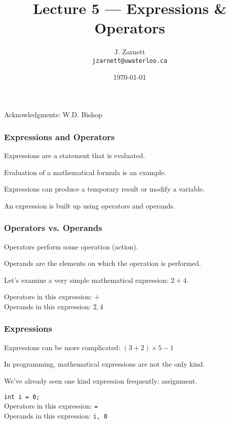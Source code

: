 

\title{Lecture 5 --- Expressions \& Operators }

\author{J. Zarnett\\
\texttt{jzarnett@uwaterloo.ca}}
\date{\today}



\begin{frame}
  \titlepage
  
  \begin{center}
  \small{Acknowledgments: W.D. Bishop}
  \end{center}
 \end{frame}
 

\begin{frame}
\frametitle{Expressions and Operators}

Expressions are a statement that is evaluated.

Evaluation of a mathematical formula is an example.

Expressions can produce a temporary result or modify a variable.

An expression is built up using \alert{operators} and \alert{operands}.

\end{frame}

\begin{frame}
\frametitle{Operators vs. Operands}

\alert{Operators} perform some operation (action).

\alert{Operands} are the elements on which the operation is performed.

Let's examine a very simple mathematical expression: $2 + 4$.


Operators in this expression: $+$\\
Operands in this expression: $2, 4$ 

\end{frame}

\begin{frame}
\frametitle{Expressions}

Expressions can be more complicated: $(3 + 2) \times 5 - 1$

In programming, mathematical expressions are not the only kind.

We've already seen one kind expression frequently: assignment. 

\texttt{int i = 0;}\\
Operators in this expression: \texttt{=}\\
Operands in this expression: \texttt{i, 0}

\end{frame}


